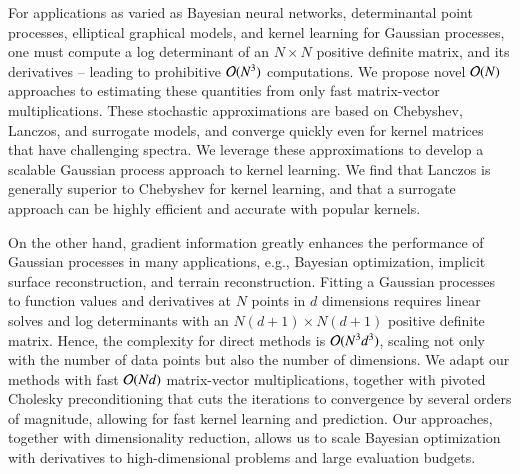 For applications as varied as Bayesian neural networks, determinantal point
processes, elliptical graphical models, and kernel learning for Gaussian
processes, one must compute a log determinant of an $N \times N$ positive
definite matrix, and its derivatives -- leading to prohibitive $\mathcal{O}(N^3)$
computations. We propose novel $\mathcal{O}(N)$ approaches to estimating these
quantities from only fast matrix\hyp{}vector multiplications. These stochastic
approximations are based on Chebyshev, Lanczos, and surrogate models, and
converge quickly even for kernel matrices that have challenging spectra. We
leverage these approximations to develop a scalable Gaussian process approach to
kernel learning. We find that Lanczos is generally superior to Chebyshev for
kernel learning, and that a surrogate approach can be highly efficient and
accurate with popular kernels.

On the other hand, gradient information greatly enhances the performance of
Gaussian processes in many applications, e.g., Bayesian optimization, implicit
surface reconstruction, and terrain reconstruction. Fitting a Gaussian processes
to function values and derivatives at $N$ points in $d$ dimensions requires
linear solves and log determinants with an ${N(d+1)\times N(d+1)}$ positive
definite matrix. Hence, the complexity for direct methods is $\mathcal{O}(N^3d^3)$,
scaling not only with the number of data points but also the number of
dimensions. We adapt our methods with fast $\mathcal{O}(Nd)$ matrix\hyp{}vector
multiplications, together with pivoted Cholesky preconditioning that cuts the
iterations to convergence by several orders of magnitude, allowing for fast
kernel learning and prediction. Our approaches, together  with dimensionality
reduction, allows us to scale Bayesian optimization with derivatives to
high\hyp{}dimensional problems and large evaluation budgets.